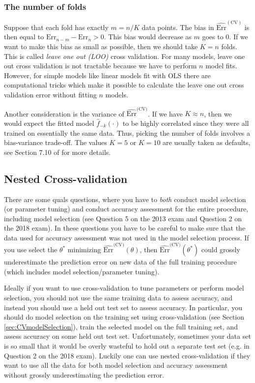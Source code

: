 \subsubsection*{The number of folds}

Suppose that each fold has exactly $m = n/K$ data points. The bias in $\widehat{\text{Err}}^{(\text{CV})}$ is then equal to $\text{Err}_{n-m} - \text{Err}_{n} > 0$. This bias would decrease as $m$ goes to $0$. If we want to make this bias as small as possible, then we should take $K=n$ folds. This is called \emph{leave one out (LOO)} cross validation. For many models, leave one out cross validation is not tractable because we have to perform $n$ model fits. However, for simple models like linear models fit with OLS there are computational tricks which make it possible to calculate the leave one out cross validation error without fitting $n$ models. 

Another consideration is the variance of $\widehat{\text{Err}}^{\text{(CV)}}$. If we have $K \approx n$, then we would expect the fitted model $\hat{f}_{-k}(\cdot)$ to be highly correlated since they were all trained on essentially the same data. Thus, picking the number of folds involves a bias-variance trade-off. The values $K=5$ or $K=10$ are usually taken as defaults, see Section 7.10 of \citep{hastie2009elements} for more details.


\subsection{Nested Cross-validation}

There are some quals questions, where you have to \textit{both} conduct model selection (or parameter tuning) and conduct accuracy assessment for the entire procedure, including model selection (see Question 5 on the 2013 exam and Question 2 on the 2018 exam). In these questions you have to be careful to make sure that the data used for accuracy assessment was not used in the model selection process. If you use select the $\theta^*$ minimizing $\widehat{\text{Err}}^{\text{(CV)}}(\theta)$, then $\widehat{\text{Err}}^{\text{(CV)}}(\theta^*)$ could grossly underestimate the prediction error on new data of the full training procedure (which includes model selection/parameter tuning).


Ideally if you want to use cross-validation to tune parameters or perform model selection, you should not use the same training data to assess accuracy, and instead you should use a held out test set to assess accuracy. In particular, you should do model selection on the training set using cross-validation (see Section \ref{sec:CVmodelSelection}), train the selected model on the full training set, and assess accuracy on some held out test set. Unfortunately, sometimes your data set is so small that it would be overly wasteful to hold out a separate test set (e.g. in Question 2 on the 2018 exam). Luckily one can use nested cross-validation if they want to use all the data for both model selection and accuracy assessment without grossly underestimating the prediction error.

